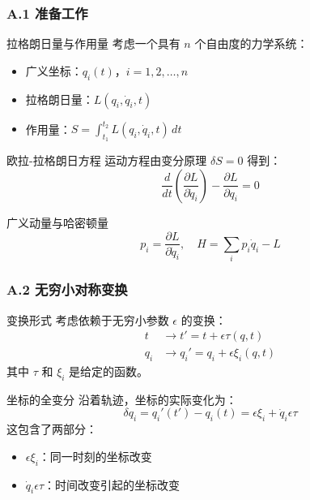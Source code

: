 \documentclass[xcolor=dvipsnames]{ctexbeamer}
\begin{document}
\begin{frame}
\frametitle{A.1 准备工作}
\begin{block}{拉格朗日量与作用量}
考虑一个具有 $n$ 个自由度的力学系统：
\begin{itemize}
\item 广义坐标：$q_i(t)$，$i = 1, 2, \ldots, n$
\item 拉格朗日量：$L(q_i, \dot{q}_i, t)$
\item 作用量：$S = \int_{t_1}^{t_2} L(q_i, \dot{q}_i, t) \, dt$
\end{itemize}
\end{block}

\pause

\begin{block}{欧拉-拉格朗日方程}
运动方程由变分原理 $\delta S = 0$ 得到：
$$\frac{d}{dt}\left(\frac{\partial L}{\partial \dot{q}_i}\right) - \frac{\partial L}{\partial q_i} = 0$$
\end{block}

\pause

\begin{block}{广义动量与哈密顿量}
$$p_i = \frac{\partial L}{\partial \dot{q}_i}, \quad H = \sum_i p_i \dot{q}_i - L$$
\end{block}
\end{frame}

\begin{frame}
\frametitle{A.2 无穷小对称变换}
\begin{block}{变换形式}
考虑依赖于无穷小参数 $\epsilon$ 的变换：
\begin{align*}
t &\to t' = t + \epsilon \tau(q, t) \\
q_i &\to q_i' = q_i + \epsilon \xi_i(q, t)
\end{align*}
其中 $\tau$ 和 $\xi_i$ 是给定的函数。
\end{block}

\pause

\begin{block}{坐标的全变分}
沿着轨迹，坐标的实际变化为：
$$\delta q_i = q_i'(t') - q_i(t) = \epsilon \xi_i + \dot{q}_i \epsilon \tau$$
这包含了两部分：
\begin{itemize}
\item $\epsilon \xi_i$：同一时刻的坐标改变
\item $\dot{q}_i \epsilon \tau$：时间改变引起的坐标改变
\end{itemize}
\end{block}
\end{frame}
\end{document}
